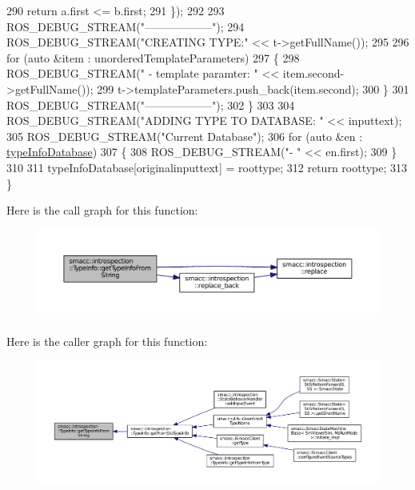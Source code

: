 \begin{DoxyCode}
290                       \textcolor{keywordflow}{return} a.first <= b.first;
291                   \});
292 
293         ROS\_DEBUG\_STREAM(\textcolor{stringliteral}{"------------------"});
294         ROS\_DEBUG\_STREAM(\textcolor{stringliteral}{"CREATING TYPE:"} << t->getFullName());
295 
296         \textcolor{keywordflow}{for} (\textcolor{keyword}{auto} &item : unorderedTemplateParameters)
297         \{
298             ROS\_DEBUG\_STREAM(\textcolor{stringliteral}{" - template paramter: "} << item.second->getFullName());
299             t->templateParameters.push\_back(item.second);
300         \}
301         ROS\_DEBUG\_STREAM(\textcolor{stringliteral}{"------------------"});
302     \}
303 
304     ROS\_DEBUG\_STREAM(\textcolor{stringliteral}{"ADDING TYPE TO DATABASE: "} << inputtext);
305     ROS\_DEBUG\_STREAM(\textcolor{stringliteral}{"Current Database"});
306     \textcolor{keywordflow}{for} (\textcolor{keyword}{auto} &en : \hyperlink{classsmacc_1_1introspection_1_1TypeInfo_ab780c03206b824aaf338135d16b0eff4}{typeInfoDatabase})
307     \{
308         ROS\_DEBUG\_STREAM(\textcolor{stringliteral}{"- "} << en.first);
309     \}
310 
311     typeInfoDatabase[originalinputtext] = roottype;
312     \textcolor{keywordflow}{return} roottype;
313 \}
\end{DoxyCode}


Here is the call graph for this function\+:
\nopagebreak
\begin{figure}[H]
\begin{center}
\leavevmode
\includegraphics[width=350pt]{classsmacc_1_1introspection_1_1TypeInfo_a47d65b6c61499d7ae8ab9f6325c84837_cgraph}
\end{center}
\end{figure}




Here is the caller graph for this function\+:
\nopagebreak
\begin{figure}[H]
\begin{center}
\leavevmode
\includegraphics[width=350pt]{classsmacc_1_1introspection_1_1TypeInfo_a47d65b6c61499d7ae8ab9f6325c84837_icgraph}
\end{center}
\end{figure}


